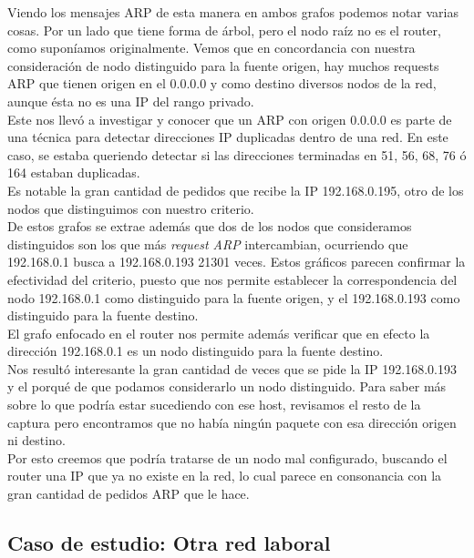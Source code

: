 \indent Viendo los mensajes ARP de esta manera en ambos grafos podemos notar varias cosas. Por un lado que tiene forma de árbol, pero el nodo raíz no es el router, como suponíamos originalmente. Vemos que en concordancia con nuestra consideración de nodo distinguido para la fuente origen, hay muchos requests ARP que tienen origen en el 0.0.0.0 y como destino diversos nodos de la red, aunque ésta no es una IP del rango privado.\\
\indent Este nos llevó a investigar y conocer que un ARP con origen 0.0.0.0 es parte de una técnica para detectar direcciones IP duplicadas dentro de una red. En este caso, se estaba queriendo detectar si las direcciones terminadas en 51, 56, 68, 76 ó 164 estaban duplicadas.\\
\indent Es notable la gran cantidad de pedidos que recibe la IP 192.168.0.195, otro de los nodos que distinguimos con nuestro criterio.\\
\indent De estos grafos se extrae además que dos de los nodos que consideramos distinguidos son los que más \textit{request ARP} intercambian, ocurriendo que  192.168.0.1 busca a 192.168.0.193 21301 veces. Estos gráficos parecen confirmar la efectividad del criterio, puesto que nos permite establecer la correspondencia del nodo 192.168.0.1 como  distinguido para la fuente origen, y el 192.168.0.193 como distinguido para la fuente destino.\\
\indent El grafo enfocado en el router nos permite además verificar que en efecto la dirección 192.168.0.1 es un nodo distinguido para la fuente destino.\\
\indent Nos resultó interesante la gran cantidad de veces que se pide la IP 192.168.0.193 y el porqué de que podamos considerarlo un nodo distinguido. Para saber más sobre lo que podría estar sucediendo con ese host, revisamos el resto de la captura pero encontramos que no había ningún paquete con esa dirección origen ni destino.\\
\indent Por esto creemos que podría tratarse de un nodo mal configurado, buscando el router una IP que ya no existe en la red, lo cual parece en consonancia con la gran cantidad de pedidos ARP que le hace.\\


\newpage
\subsection{Caso de estudio: Otra red laboral}

